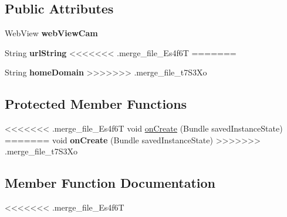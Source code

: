 \subsection*{Public Attributes}
\begin{DoxyCompactItemize}
\item 
\mbox{\label{classnet_1_1mobiledevelopment_1_1camandeggs_1_1_main_activity_a97160c3eb4058966248714309ec8a36a}} 
Web\+View {\bfseries web\+View\+Cam}
\item 
\mbox{\label{classnet_1_1mobiledevelopment_1_1camandeggs_1_1_main_activity_adb85cb0ddaf038354e363e57a4738011}} 
String {\bfseries url\+String}
<<<<<<< .merge_file_Es4f6T
=======
\item 
\mbox{\label{classnet_1_1mobiledevelopment_1_1camandeggs_1_1_main_activity_acbc7fbb8d4e33f1bc7349ee0867012b8}} 
String {\bfseries home\+Domain}
>>>>>>> .merge_file_t7S3Xo
\end{DoxyCompactItemize}
\subsection*{Protected Member Functions}
\begin{DoxyCompactItemize}
\item 
<<<<<<< .merge_file_Es4f6T
void \hyperlink{classnet_1_1mobiledevelopment_1_1camandeggs_1_1_main_activity_a7e78ddf7c51cf7932de66127ed304ef0}{on\+Create} (Bundle saved\+Instance\+State)
=======
\mbox{\label{classnet_1_1mobiledevelopment_1_1camandeggs_1_1_main_activity_a7e78ddf7c51cf7932de66127ed304ef0}} 
void {\bfseries on\+Create} (Bundle saved\+Instance\+State)
>>>>>>> .merge_file_t7S3Xo
\end{DoxyCompactItemize}


\subsection{Member Function Documentation}
<<<<<<< .merge_file_Es4f6T
\mbox{\label{classnet_1_1mobiledevelopment_1_1camandeggs_1_1_main_activity_a7e78ddf7c51cf7932de66127ed304ef0}} 
